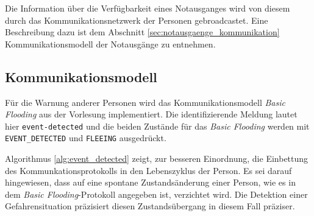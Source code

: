 Die Information über die Verfügbarkeit eines Notausganges wird von diesem durch das Kommunikationsnetzwerk der Personen gebroadcastet. Eine Beschreibung dazu ist dem Abschnitt \ref{sec:notausgaenge_kommunikation} Kommunikationsmodell der Notausgänge zu entnehmen.

\subsection{Kommunikationsmodell}
\label{sec:kommunikationsmodell}

Für die Warnung anderer Personen wird das Kommunikationsmodell \emph{Basic Flooding} aus der Vorlesung implementiert. Die identifizierende Meldung lautet hier \verb|event-detected| und die beiden Zustände für das \emph{Basic Flooding} werden mit \verb|EVENT_DETECTED| und \verb|FLEEING| ausgedrückt. 

Algorithmus \ref{alg:event_detected} zeigt, zur besseren Einordnung, die Einbettung des Kommunkationsprotokolls in den Lebenszyklus der Person. Es sei darauf hingewiesen, dass auf eine spontane Zustandsänderung einer Person, wie es in dem \emph{Basic Flooding}-Protokoll angegeben ist, verzichtet wird. Die Detektion einer Gefahrensituation präzisiert diesen Zustandsübergang in diesem Fall präziser.

